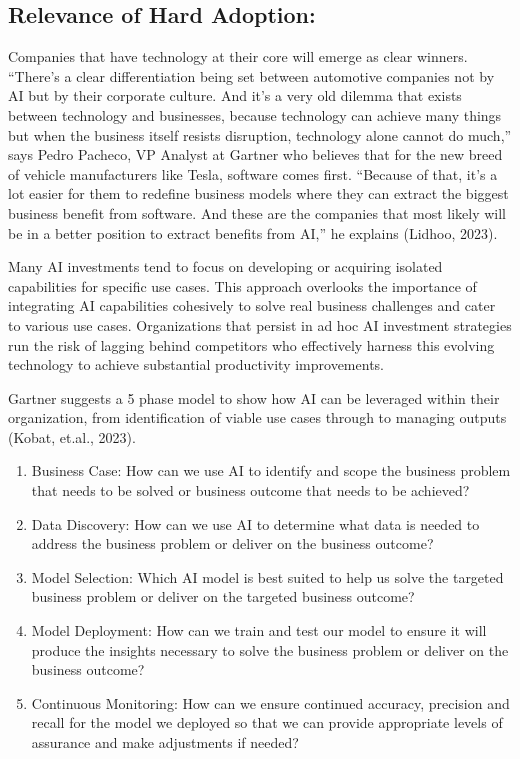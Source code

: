 \documentclass[
]{article}
\begin{document}
\hypertarget{relevance-of-hard-adoption}{%
\subsection*{Relevance of Hard Adoption:}\label{relevance-of-hard-adoption}}

Companies that have technology at their core will emerge as clear winners. ``There's a clear differentiation being set between automotive companies not by AI but by their corporate culture. And it's a very old dilemma that exists between technology and businesses, because technology can achieve many things but when the business itself resists disruption, technology alone cannot do much,'' says Pedro Pacheco, VP Analyst at Gartner who believes that for the new breed of vehicle manufacturers like Tesla, software comes first. ``Because of that, it's a lot easier for them to redefine business models where they can extract the biggest business benefit from software. And these are the companies that most likely will be in a better position to extract benefits from AI,'' he explains (Lidhoo, 2023).

Many AI investments tend to focus on developing or acquiring isolated capabilities for specific use cases. This approach overlooks the importance of integrating AI capabilities cohesively to solve real business challenges and cater to various use cases. Organizations that persist in ad hoc AI investment strategies run the risk of lagging behind competitors who effectively harness this evolving technology to achieve substantial productivity improvements.

Gartner suggests a 5 phase model to show how AI can be leveraged within their organization, from identification of viable use cases through to managing outputs (Kobat, et.al., 2023).

\begin{enumerate}
\def\labelenumi{\arabic{enumi}.}
\item
  Business Case: How can we use AI to identify and scope the business problem that needs to be solved or business outcome that needs to be achieved?
\item
  Data Discovery: How can we use AI to determine what data is needed to address the business problem or deliver on the business outcome?
\item
  Model Selection: Which AI model is best suited to help us solve the targeted business problem or deliver on the targeted business outcome?
\item
  Model Deployment: How can we train and test our model to ensure it will produce the insights necessary to solve the business problem or deliver on the business outcome?
\item
  Continuous Monitoring: How can we ensure continued accuracy, precision and recall for the model we deployed so that we can provide appropriate levels of assurance and make adjustments if needed?
\end{enumerate}
\end{document}
